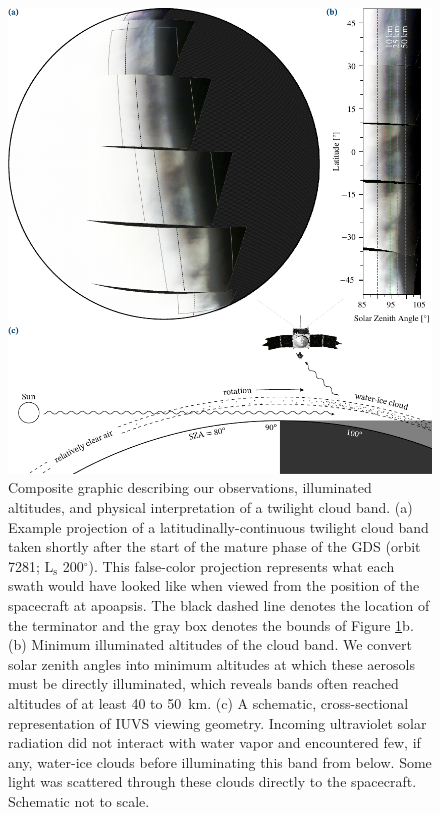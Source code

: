 \documentclass[draft]{agujournal2019}
\begin{document}
\begin{figure}[ht!]
    \centerline{\includegraphics[width=\textwidth]{observation_geometry.pdf}}
    \caption{Composite graphic describing our observations, illuminated altitudes, and physical interpretation of a twilight cloud band. (a) Example projection of a latitudinally-continuous twilight cloud band taken shortly after the start of the mature phase of the GDS (orbit 7281; $\mathrm{L_s}$ 200$^\circ$). This false-color projection represents what each swath would have looked like when viewed from the position of the spacecraft at apoapsis. The black dashed line denotes the location of the terminator and the gray box denotes the bounds of Figure \ref{observation_geometry}b. (b) Minimum illuminated altitudes of the cloud band. We convert solar zenith angles into minimum altitudes at which these aerosols must be directly illuminated, which reveals bands often reached altitudes of at least 40 to 50~km. (c) A schematic, cross-sectional representation of IUVS viewing geometry. Incoming ultraviolet solar radiation did not interact with water vapor and encountered few, if any, water-ice clouds before illuminating this band from below. Some light was scattered through these clouds directly to the spacecraft. Schematic not to scale.}
    \label{observation_geometry}
\end{figure}
\end{document}

